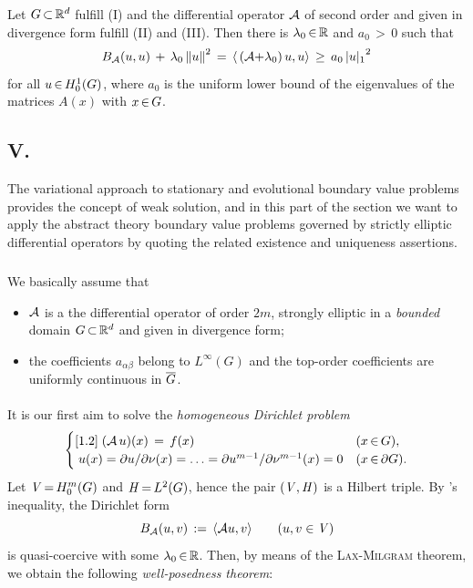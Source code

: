 \documentclass[11pt,twoside]{article}
\def\G{G}
\begin{document}
\begin{theorem1}\label{GARDING_INEQUALITY_THEOREM_II}
Let $\G \xsubset \Rd$ fulfill (I) and
the differential operator ${\mathcal{A}}$ of second order and given in divergence form
fulfill (II) and (III).
Then there is $\lambda_0 {\,\in\,} {\mathbb{R}}$ and $a_0 {\,>\,} 0$ such that
\[
\DF_{\A}(u,u) \+ \lambda_0 \norm{u}^2
\=
\scalar{\,(\A {+} \lambda_0)\,u}{u}
\, \geq \,
a_0 \, {\abs{u} _1}^2
\]
for all $u \xeof \HN{1}{\G}$,
where $a_0$ is the uniform lower bound of the eigenvalues
of the matrices $A(x)$ with $x \xeof \G$.
\end{theorem1}

\subsection*{V. {\TITLEE}}
The variational approach to stationary and evolutional boundary value problems
provides the concept of weak solution,
and in this part of the section we want to apply the abstract theory
boundary value problems governed by strictly elliptic differential operators
by quoting the related existence and uniqueness assertions.

\subparagraph{} %
We basically assume that

\begin{itemize}[leftmargin=15mm]
\item[(DP-1)]
${\mathcal{A}}$ is a the differential operator of order $2m$,
strongly elliptic in a \textit{bounded} domain $\G \xsubset \Rd$
and given in divergence form;

\item[(DP-2)]
the coefficients $a_{\alpha \beta}$ belong to $L^{\infty}(\G)$
and the top-order coefficients are uniformly continuous in $\clG$.
\end{itemize}

\paragraph{} %
It is our first aim to solve the \textit{homogeneous Dirichlet problem}
\[
\begin{cases}[1.2]
\; (\A\,u)(x)\= f(x)& (x \xeof \G),\\
\; u(x) =
\partial u/ \partial \nu (x) =
\ldots = \partial u^{m{-}1} / \partial \nu^{m{-}1}(x) = 0 & (x \xeof \bndG).\\
\end{cases}
\]
Let $\vecV \eq \HN{m}{\G}$ and $\hilH \eq \Lh$,
hence the pair $(\mathit{V},\mathit{H})$ is a Hilbert triple.
By \textsc{{\GARDING}}'s inequality,
the Dirichlet form
\[
B_{{\mathcal{A}}}(u,v) \,:=\, \langle {\mathcal{A}} u,v \rangle \quad \quad (u,v \in \mathit{V})
\]
is quasi-coercive with some $\lambda_0 {\,\in\,} {\mathbb{R}}$.
Then,
by means of the \textsc{Lax-Milgram} theorem,
we obtain the following \textit{well-posedness theorem}:
\end{document}
